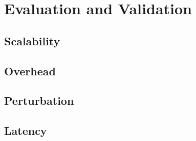 
\section{Evaluation and Validation}
\subsection{Scalability}
\subsection{Overhead}
\subsection{Perturbation}
\subsection{Latency}



